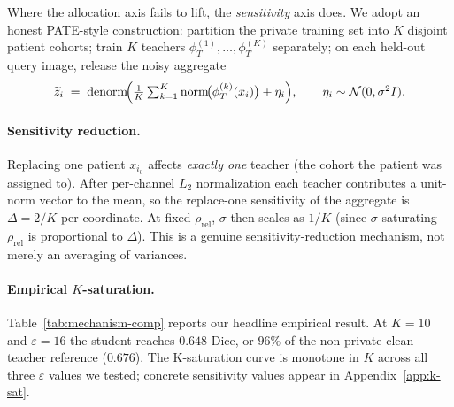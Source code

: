 Where the allocation axis fails to lift, the \emph{sensitivity} axis
does. We adopt an honest PATE-style construction: partition the
private training set into $K$ disjoint patient cohorts; train $K$
teachers $\phi_T^{(1)},\ldots,\phi_T^{(K)}$ separately; on each
held-out query image, release the noisy aggregate
\begin{equation}
\widetilde{z}_i
 \;=\; \mathrm{denorm}\!\Bigl(
      \tfrac{1}{K}\textstyle\sum_{k=1}^{K}\mathrm{norm}\!\bigl(\phi_T^{(k)}(x_i)\bigr)
      + \eta_i\Bigr),
\qquad \eta_i\sim\mathcal{N}(0,\sigma^2 I).
\label{eq:pate-release}
\end{equation}

\paragraph{Sensitivity reduction.}
Replacing one patient $x_{i_0}$ affects \emph{exactly one} teacher
(the cohort the patient was assigned to). After per-channel $L_2$
normalization each teacher contributes a unit-norm vector to the
mean, so the replace-one sensitivity of the aggregate is
$\Delta = 2/K$ per coordinate. At fixed $\rho_{\mathrm{rel}}$,
$\sigma$ then scales as $1/K$ (since $\sigma$ saturating
$\rho_{\mathrm{rel}}$ is proportional to $\Delta$). This is a genuine
sensitivity-reduction mechanism, not merely an averaging of variances.

\paragraph{Empirical $K$-saturation.}
Table~\ref{tab:mechanism-comp} reports our headline empirical result.
At $K{=}10$ and $\varepsilon{=}16$ the student reaches $0.648$ Dice,
or $96\%$ of the non-private clean-teacher reference ($0.676$). The
K-saturation curve is monotone in $K$ across all three $\varepsilon$
values we tested; concrete sensitivity values appear in
Appendix~\ref{app:k-sat}.

